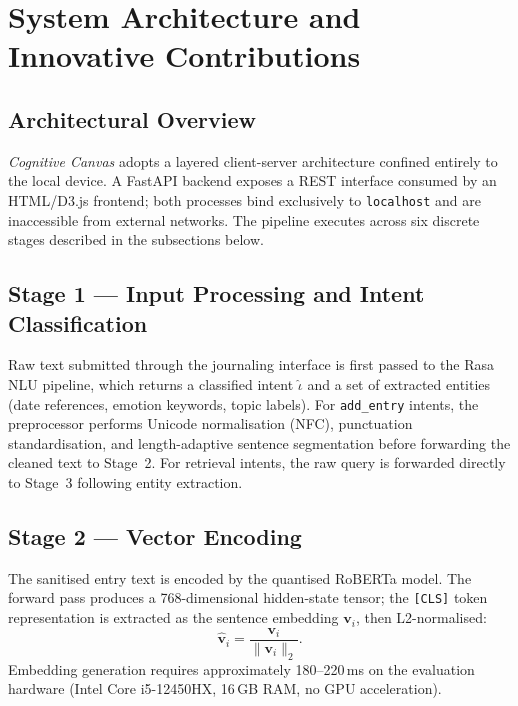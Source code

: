 \documentclass[12pt, letterpaper]{article}
\newcommand{\CC}{\textit{Cognitive Canvas}}
\begin{document}
\section{System Architecture and Innovative Contributions}

\subsection{Architectural Overview}

\CC{} adopts a layered client-server architecture confined
entirely to the local device.
A FastAPI backend exposes a REST interface consumed by an
HTML/D3.js frontend; both processes bind exclusively to
\texttt{localhost} and are inaccessible from external networks.
The pipeline executes across six discrete stages described
in the subsections below.

\subsection{Stage 1 --- Input Processing and Intent Classification}

Raw text submitted through the journaling interface is first
passed to the Rasa NLU pipeline, which returns a classified
intent $\hat{\iota}$ and a set of extracted entities (date
references, emotion keywords, topic labels).
For \texttt{add\_entry} intents, the preprocessor performs
Unicode normalisation (NFC), punctuation standardisation, and
length-adaptive sentence segmentation before forwarding the
cleaned text to Stage~2.
For retrieval intents, the raw query is forwarded directly to
Stage~3 following entity extraction.

\subsection{Stage 2 --- Vector Encoding}

The sanitised entry text is encoded by the quantised RoBERTa
model.
The forward pass produces a 768-dimensional hidden-state
tensor; the \texttt{[CLS]} token representation is extracted
as the sentence embedding $\mathbf{v}_i$, then L2-normalised:
\begin{equation}
\hat{\mathbf{v}}_i = \frac{\mathbf{v}_i}{\|\mathbf{v}_i\|_2}.
\label{eq:normalise}
\end{equation}
Embedding generation requires approximately 180--220\,ms on
the evaluation hardware (Intel Core i5-12450HX, 16\,GB RAM,
no GPU acceleration).
\end{document}
